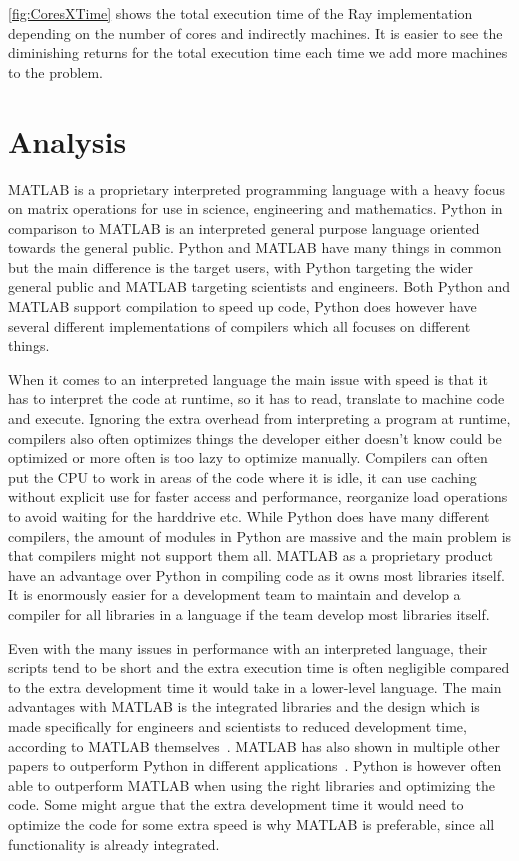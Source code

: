 \documentclass[12pt, a4paper]{article}
\begin{document}
\cref{fig:CoresXTime} shows the total execution time of the Ray implementation depending on the number of cores and indirectly machines.
It is easier to see the diminishing returns for the total execution time each time we add more machines to the problem.


\section{Analysis}

MATLAB is a proprietary interpreted programming language with a heavy focus on matrix operations for use in science, engineering and mathematics.
Python in comparison to MATLAB is an interpreted general purpose language oriented towards the general public.
Python and MATLAB have many things in common but the main difference is the target users, with Python targeting the wider general public and MATLAB targeting scientists and engineers.
Both Python and MATLAB support compilation to speed up code, Python does however have several different implementations of compilers which all focuses on different things.

When it comes to an interpreted language the main issue with speed is that it has to interpret the code at runtime, so it has to read, translate to machine code and execute.
Ignoring the extra overhead from interpreting a program at runtime, compilers also often optimizes things the developer either doesn't know could be optimized or more often is too lazy to optimize manually.
Compilers can often put the CPU to work in areas of the code where it is idle, it can use caching without explicit use for faster access and performance, reorganize load operations to avoid waiting for the harddrive etc. 
While Python does have many different compilers, the amount of modules in Python are massive and the main problem is that compilers might not support them all.
MATLAB as a proprietary product have an advantage over Python in compiling code as it owns most libraries itself.
It is enormously easier for a development team to maintain and develop a compiler for all libraries in a language if the team develop most libraries itself. 

Even with the many issues in performance with an interpreted language, their scripts tend to be short and the extra execution time is often negligible compared to the extra development time it would take in a lower-level language.
The main advantages with MATLAB is the integrated libraries and the design  which is made specifically for engineers and scientists to reduced development time, according to MATLAB themselves~\cite{WhyMatlab}. 
MATLAB has also shown in multiple other papers to outperform Python in different applications~\cite{EMMatVsPy, ARUOBA2015265}.
Python is however often able to outperform MATLAB when using the right libraries and optimizing the code.
Some might argue that the extra development time it would need to optimize the code for some extra speed is why MATLAB is preferable, since all functionality is already integrated.
\end{document}
